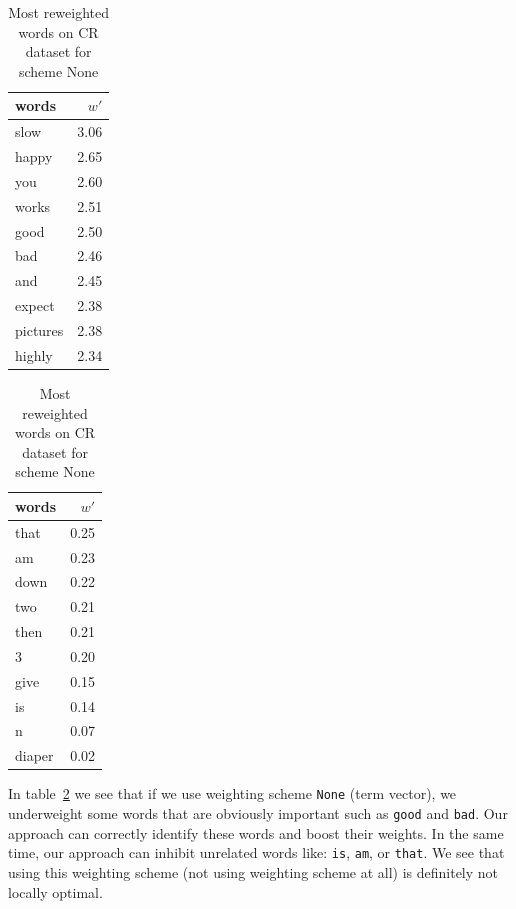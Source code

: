\begin{table}[H]
    \centering
    \begin{minipage}{.4\linewidth}
      \centering
        \begin{tabular}{lr}
\toprule
    words &  $w'$ \\
\midrule
     slow &  3.06 \\
    happy &  2.65 \\
      you &  2.60 \\
    works &  2.51 \\
     good &  2.50 \\
      bad &  2.46 \\
      and &  2.45 \\
   expect &  2.38 \\
 pictures &  2.38 \\
   highly &  2.34 \\
\bottomrule
\end{tabular}

    \end{minipage}
    \begin{minipage}{.4\linewidth}
      \centering
        \begin{tabular}{lr}
\toprule
  words &  $w'$ \\
\midrule
   that &  0.25 \\
     am &  0.23 \\
   down &  0.22 \\
    two &  0.21 \\
   then &  0.21 \\
      3 &  0.20 \\
   give &  0.15 \\
     is &  0.14 \\
      n &  0.07 \\
 diaper &  0.02 \\
\bottomrule
\end{tabular}

    \end{minipage} 
    \caption{Most reweighted words on CR dataset for scheme None}
    \label{tab:words:CR:None}
\end{table}

    In table~\ref{tab:words:CR:None} we see that if we use weighting scheme \texttt{None} (term vector), 
    we underweight some words that are obviously important such as \texttt{good} and \texttt{bad}.
    Our approach can correctly identify these words and boost their weights.
    In the same time, our approach can inhibit unrelated words like: \texttt{is}, \texttt{am}, or \texttt{that}.
    We see that using this weighting scheme (not using weighting scheme at all) is definitely not locally optimal.
    
